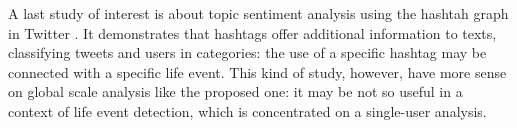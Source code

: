 A last study of interest is about topic sentiment analysis using the hashtah graph in Twitter \cite{wang2011topic}. It demonstrates that hashtags offer additional information to texts, classifying tweets and users in categories: the use of a specific hashtag may be connected with a specific life event. This kind of study, however, have more sense on global scale analysis like the proposed one: it may be not so useful in a context of life event detection, which is concentrated on a single-user analysis.
